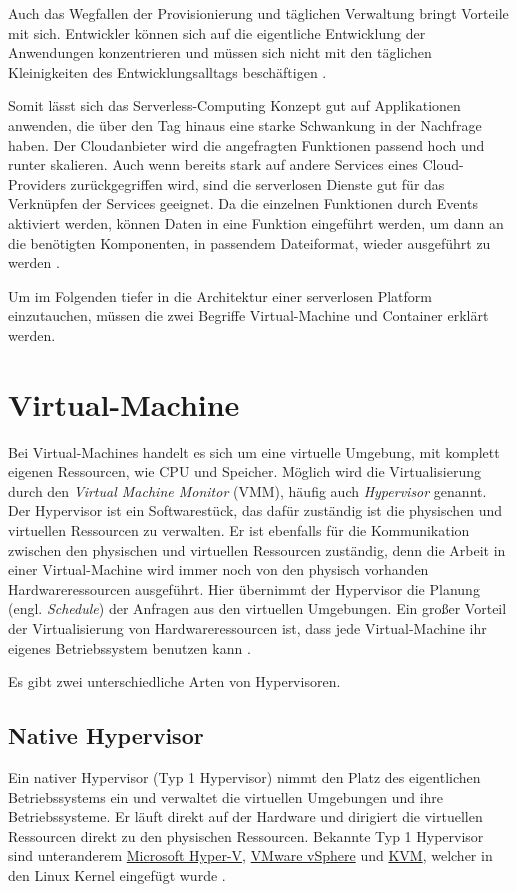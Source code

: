 Auch das Wegfallen der Provisionierung und täglichen Verwaltung bringt Vorteile mit sich.
Entwickler können sich auf die eigentliche Entwicklung der Anwendungen konzentrieren und
müssen sich nicht mit den täglichen Kleinigkeiten des Entwicklungsalltags
beschäftigen \cite{DBLP:journals/corr/BaldiniCCCFIMMR17}.

Somit lässt sich das Serverless-Computing Konzept gut auf Applikationen anwenden,
die über den Tag hinaus eine starke Schwankung in der Nachfrage haben. Der Cloudanbieter wird
die angefragten Funktionen passend hoch und runter skalieren. Auch wenn bereits stark auf 
andere Services eines Cloud-Providers zurückgegriffen wird, sind die serverlosen Dienste
gut für das Verknüpfen der Services geeignet. Da die einzelnen Funktionen durch Events
aktiviert werden, können Daten in eine Funktion eingeführt werden, um
dann an die benötigten Komponenten, in passendem Dateiformat, wieder ausgeführt zu werden
\cite{DBLP:journals/corr/BaldiniCCCFIMMR17} \cite{HpcServerless}.

Um im Folgenden tiefer in die Architektur einer serverlosen Platform einzutauchen, müssen
die zwei Begriffe Virtual-Machine und Container erklärt werden.

\section{Virtual-Machine}
Bei Virtual-Machines handelt es sich um eine virtuelle Umgebung, mit komplett 
eigenen Ressourcen, wie CPU und Speicher.
Möglich wird die Virtualisierung durch den \textit{Virtual Machine Monitor} (VMM),
häufig auch \textit{Hypervisor} genannt.
Der Hypervisor ist ein Softwarestück, das dafür zuständig ist die physischen
und virtuellen Ressourcen zu verwalten. Er ist ebenfalls für die Kommunikation
zwischen den physischen und virtuellen Ressourcen zuständig, denn die Arbeit in einer
Virtual-Machine wird immer noch von den physisch vorhanden Hardwareressourcen ausgeführt.
Hier übernimmt der Hypervisor die Planung (engl. \textit{Schedule}) der Anfragen aus
den virtuellen Umgebungen. Ein großer Vorteil der Virtualisierung von Hardwareressourcen ist,
dass jede Virtual-Machine ihr eigenes Betriebssystem benutzen kann
\cite{RedHatVM} \cite{RedHatHypervisor}.

Es gibt zwei unterschiedliche Arten von Hypervisoren.

\subsection{Native Hypervisor}
Ein nativer Hypervisor (Typ 1 Hypervisor) nimmt den Platz des eigentlichen Betriebssystems ein
und verwaltet die virtuellen Umgebungen und ihre Betriebssysteme. Er läuft direkt
auf der Hardware und dirigiert die virtuellen Ressourcen direkt zu den physischen Ressourcen.
Bekannte Typ 1 Hypervisor sind unteranderem
\href{https://docs.microsoft.com/de-de/virtualization/hyper-v-on-windows/}{Microsoft Hyper-V},
\href{https://www.vmware.com/de/products/vsphere.html}{VMware vSphere} und
\href{https://www.linux-kvm.org/page/Main_Page}{KVM}, welcher in den Linux
Kernel eingefügt wurde
\cite{RedHatHypervisor}.

